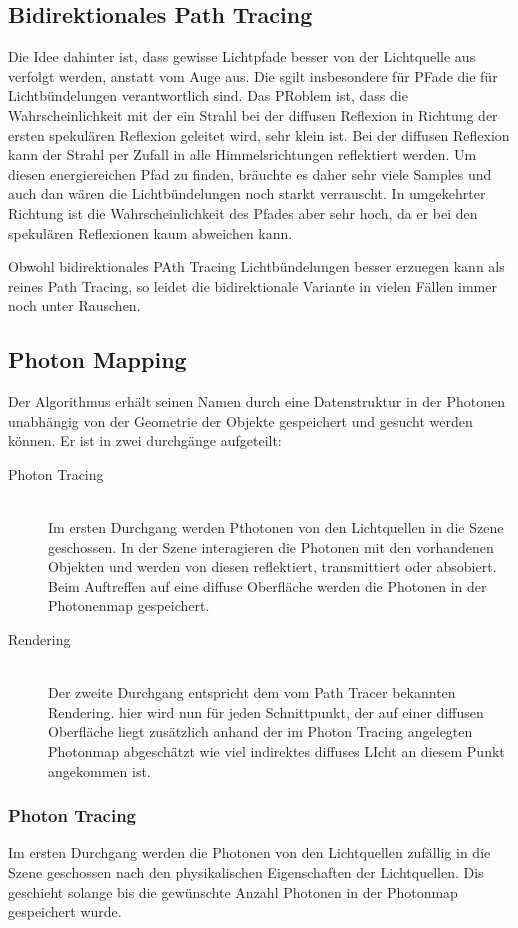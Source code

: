 \documentclass[10pt]{article}
\begin{document}
\subsection{Bidirektionales Path Tracing}
Die Idee dahinter ist, dass gewisse Lichtpfade besser von der Lichtquelle aus verfolgt werden, anstatt vom Auge aus. Die sgilt insbesondere für PFade die für Lichtbündelungen verantwortlich sind. Das PRoblem ist, dass die Wahrscheinlichkeit mit der ein Strahl bei der diffusen Reflexion in Richtung der ersten spekulären Reflexion geleitet wird, sehr klein ist. Bei der diffusen Reflexion kann der Strahl per Zufall in alle Himmelsrichtungen reflektiert werden. Um diesen energiereichen Pfad zu finden, bräuchte es daher sehr viele Samples und auch dan wären die Lichtbündelungen noch starkt verrauscht. In umgekehrter Richtung ist die Wahrscheinlichkeit des Pfades aber sehr hoch, da er bei den spekulären Reflexionen kaum abweichen kann.

Obwohl bidirektionales PAth Tracing Lichtbündelungen besser erzuegen kann als reines Path Tracing, so leidet die bidirektionale Variante in vielen Fällen immer noch unter Rauschen.

\subsection{Photon Mapping}
Der Algorithmus erhält seinen Namen durch eine Datenstruktur in der Photonen unabhängig von der Geometrie der Objekte gespeichert und gesucht werden können. Er ist in zwei durchgänge aufgeteilt:
\begin{description}
	\item[Photon Tracing] \hfill \\
		Im ersten Durchgang werden Pthotonen von den Lichtquellen in die Szene geschossen. In der Szene interagieren die Photonen mit den vorhandenen Objekten und werden von diesen reflektiert, transmittiert oder absobiert. Beim Auftreffen auf eine diffuse Oberfläche werden die Photonen in der Photonenmap gespeichert.
	\item[Rendering] \hfill \\
		Der zweite Durchgang entspricht dem vom Path Tracer bekannten Rendering. hier wird nun für jeden Schnittpunkt, der auf einer diffusen Oberfläche liegt zusätzlich anhand der im Photon Tracing angelegten Photonmap abgeschätzt wie viel indirektes diffuses LIcht an diesem Punkt angekommen ist.
\end{description}
\subsubsection{Photon Tracing}
Im ersten Durchgang werden die Photonen von den Lichtquellen zufällig in die Szene geschossen nach den physikalischen Eigenschaften der Lichtquellen. Dis geschieht solange bis die gewünschte Anzahl Photonen in der Photonmap gespeichert wurde.
\end{document}
